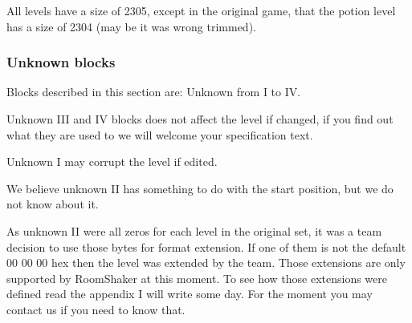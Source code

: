 \documentclass{article}
\begin{document}
\pagebreak[3]
\pagebreak[3]

 All levels have a size of 2305, except in the original game, that the
 potion level has a size of 2304 (may be it was wrong trimmed).

\subsubsection{Unknown blocks} %
 Blocks described in this section are: Unknown from I to IV.

 Unknown III and IV blocks does not affect the level if changed, if you
 find out what they are used to we will welcome your specification text.

 Unknown I may corrupt the level if edited.

 We believe unknown II has something to do with the start position, but we
 do not know about it.

 As unknown II were all zeros for each level in the original set, it was a
 team decision to use those bytes for format extension. If one of them is
 not the default 00 00 00 hex then the level was extended by the team.
 Those extensions are only supported by RoomShaker at this  moment. To see
 how those extensions were defined read the appendix I will write some day.
 For the moment you may contact us if you need to know that.
\end{document}
